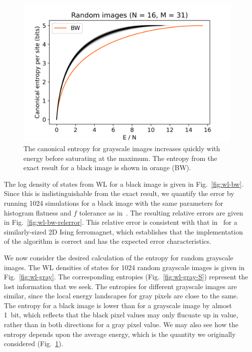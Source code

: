 \documentclass[aps,reprint]{revtex4-2}
\theoremstyle{plain}
\theoremstyle{definition}
\begin{document}
\begin{figure}
  \centering
  \includegraphics[width=\linewidth]{wanglandau-gray-ES}
  \caption{The canonical entropy for grayscale images increases quickly with
    energy before saturating at the maximum. The entropy from the exact result
  for a black image is shown in orange (BW).}\label{fig:wl-gray-ES}
\end{figure}

The log density of states from WL for a black image is given in
Fig.~\ref{fig:wl-bw}. Since this is indistinguishable from the exact result, we
quantify the error by running \num{1024} simulations for a black image with the
same parameters for histogram flatness and $f$ tolerance as
in~\cite{wanglandau-ajp}. The resulting relative errors are given in
Fig.~\ref{fig:wl-bw-relerror}. This relative error is consistent with that
in~\cite{wanglandau-ajp} for a similarly-sized 2D Ising ferromagnet, which
establishes that the implementation of the algorithm is correct and has the
expected error characteristics.

We now consider the desired calculation of the entropy for random grayscale
images. The WL densities of states for \num{1024} random grayscale images is
given in Fig.~\ref{fig:wl-gray}. The corresponding entropies
(Fig.~\ref{fig:wl-gray-S}) represent the lost information that we seek. The
entropies for different grayscale images are similar, since the local energy
landscapes for gray pixels are close to the same. The entropy for a black image
is lower than for a grayscale image by almost \SI{1}{bit}, which reflects that
the black pixel values may only flucuate up in value, rather than in both
directions for a gray pixel value. We may also see how the entropy depends upon
the average energy, which is the quantity we originally considered
(Fig.~\ref{fig:wl-gray-ES}).
\end{document}
